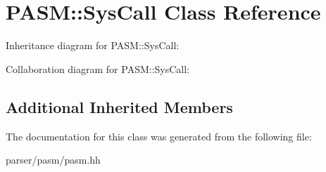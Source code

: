 \hypertarget{classPASM_1_1SysCall}{}\section{P\+A\+SM\+:\+:Sys\+Call Class Reference}
\label{classPASM_1_1SysCall}


Inheritance diagram for P\+A\+SM\+:\+:Sys\+Call\+:


Collaboration diagram for P\+A\+SM\+:\+:Sys\+Call\+:
\subsection*{Additional Inherited Members}


The documentation for this class was generated from the following file\+:\begin{DoxyCompactItemize}
\item 
parser/pasm/pasm.\+hh\end{DoxyCompactItemize}
